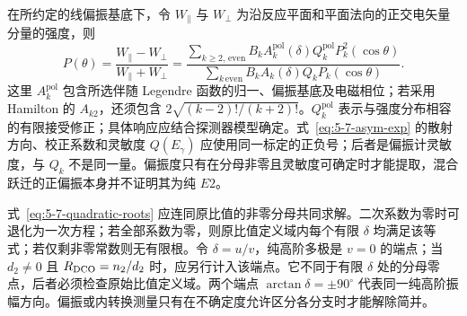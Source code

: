在所约定的线偏振基底下，令 $W_\parallel$ 与 $W_\perp$ 为沿反应平面和平面法向的正交电矢量分量的强度，则
\begin{equation}\label{eq:5-7-pol-theor}
P(\theta)=\frac{W_\parallel-W_\perp}{W_\parallel+W_\perp}
=\frac{\sum_{k\geq2,\,\mathrm{even}}B_k A_k^{\mathrm{pol}}(\delta)Q_k^{\mathrm{pol}}P_k^{2}(\cos\theta)}{\sum_{k\,\mathrm{even}}B_k A_k(\delta)Q_kP_k(\cos\theta)}.
\end{equation}
这里 $A_k^{\mathrm{pol}}$ 包含所选伴随 Legendre 函数的归一、偏振基底及电磁相位；若采用 Hamilton 的 $A_{k2}$，还须包含 $2\sqrt{(k-2)!/(k+2)!}$。$Q_k^{\mathrm{pol}}$ 表示与强度分布相容的有限接受修正；具体响应应结合探测器模型确定。式~\eqref{eq:5-7-asym-exp} 的散射方向、校正系数和灵敏度 $Q(E_\gamma)$ 应使用同一标定的正负号；后者是偏振计灵敏度，与 $Q_k$ 不是同一量。偏振度只有在分母非零且灵敏度可确定时才能提取，混合跃迁的正偏振本身并不证明其为纯 $E2$。

式~\eqref{eq:5-7-quadratic-roots} 应连同原比值的非零分母共同求解。二次系数为零时可退化为一次方程；若全部系数为零，则原比值定义域内每个有限 $\delta$ 均满足该等式；若仅剩非零常数则无有限根。令 $\delta=u/v$，纯高阶多极是 $v=0$ 的端点；当 $d_2\ne0$ 且 $R_{\rm DCO}=n_2/d_2$ 时，应另行计入该端点。它不同于有限 $\delta$ 处的分母零点，后者必须检查原始比值定义域。两个端点 $\arctan\delta=\pm90^\circ$ 代表同一纯高阶振幅方向。偏振或内转换测量只有在不确定度允许区分各分支时才能解除简并。

